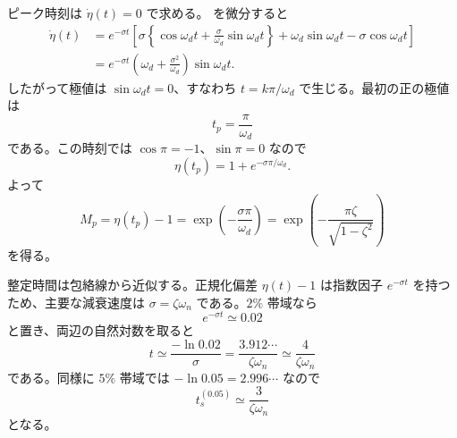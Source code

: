 ピーク時刻は $\dot{\eta}(t)=0$ で求める。 を微分すると
\begin{align}
  \dot{\eta}(t)
  &=
  e^{-\sigma t}
  \left[
    \sigma\left\{\cos\omega_d t+
    \frac{\sigma}{\omega_d}\sin\omega_d t\right\}
    +\omega_d\sin\omega_d t-\sigma\cos\omega_d t
  \right]\\
  &=
  e^{-\sigma t}
  \left(\omega_d+\frac{\sigma^2}{\omega_d}\right)\sin\omega_d t.
\end{align}
したがって極値は $\sin\omega_d t=0$、すなわち $t=k\pi/\omega_d$ で生じる。最初の正の極値は
\begin{equation}
  t_p=\frac{\pi}{\omega_d}
\end{equation}
である。この時刻では $\cos\pi=-1$、$\sin\pi=0$ なので
\begin{equation}
  \eta(t_p)
  =1+e^{-\sigma\pi/\omega_d}.
\end{equation}
よって
\begin{equation}
  M_p=\eta(t_p)-1
  =
  \exp\left(-\frac{\sigma\pi}{\omega_d}\right)
  =
  \exp\left(-\frac{\pi\zeta}{\sqrt{1-\zeta^2}}\right)
\end{equation}
を得る。

整定時間は包絡線から近似する。正規化偏差 $\eta(t)-1$ は指数因子 $e^{-\sigma t}$ を持つため、主要な減衰速度は $\sigma=\zeta\omega_n$ である。$2\%$ 帯域なら
\begin{equation}
  e^{-\sigma t}\simeq0.02
\end{equation}
と置き、両辺の自然対数を取ると
\begin{equation}
  t\simeq\frac{-\ln0.02}{\sigma}
  =\frac{3.912\cdots}{\zeta\omega_n}
  \simeq \frac{4}{\zeta\omega_n}
\end{equation}
である。同様に $5\%$ 帯域では $-\ln0.05=2.996\cdots$ なので
\begin{equation}
  t_s^{(0.05)}\simeq\frac{3}{\zeta\omega_n}
\end{equation}
となる。

